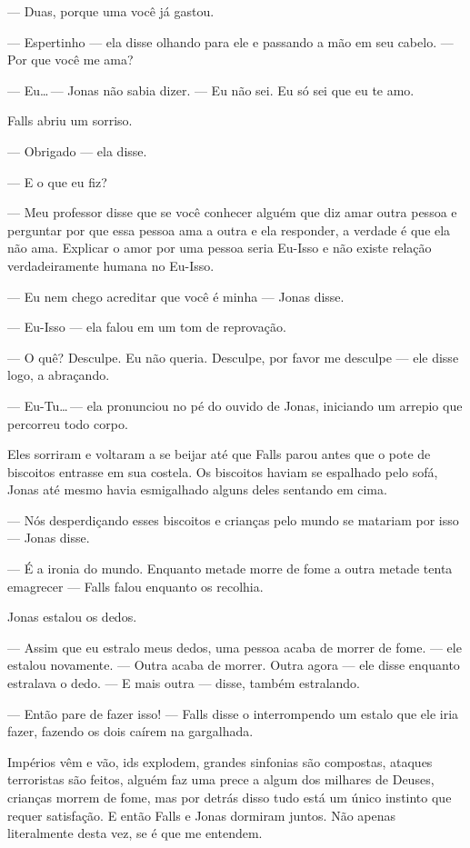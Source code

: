 --- Duas, porque uma você já gastou.

--- Espertinho --- ela disse\mudanca{,} olhando para ele e passando a mão em seu cabelo. --- Por que você me ama?

--- Eu\ldots\,--- Jonas não sabia dizer. --- Eu não sei. Eu só sei que eu te amo.

Falls abriu um sorriso.

--- Obrigado --- ela disse.

--- E o que eu fiz?

--- Meu professor disse que se você conhecer alguém que diz amar outra pessoa e perguntar por que essa pessoa ama a outra e ela responder, a verdade é que ela não ama. Explicar o amor por uma pessoa seria Eu-Isso e não existe relação verdadeiramente humana no Eu-Isso.

--- Eu nem chego acreditar que você é minha --- Jonas disse.

--- Eu-Isso --- ela falou em um tom de reprovação.

--- O quê? Desculpe. Eu não queria. Desculpe, por favor me desculpe --- ele disse logo, a abraçando.

--- Eu-Tu\ldots\,--- ela pronunciou no pé do ouvido de Jonas, iniciando um arrepio que percorreu todo  corpo.

Eles sorriram e voltaram a se beijar até que Falls parou\mudanca{,} antes que o pote de biscoitos entrasse em sua costela. Os biscoitos haviam se espalhado pelo sofá, Jonas até mesmo havia esmigalhado alguns deles sentando em cima.

--- Nós desperdiçando esses biscoitos e crianças pelo mundo se matariam por isso ---  Jonas disse.

--- É a ironia do mundo. Enquanto metade morre de fome\mudanca{,} a outra metade tenta emagrecer --- Falls falou enquanto\mudanca{,} os recolhia.

Jonas estalou os dedos.

--- Assim que eu estralo meus dedos, uma pessoa acaba de morrer de fome. --- ele estalou novamente. --- Outra acaba de morrer. Outra agora --- ele disse enquanto estralava o dedo. --- E mais outra --- disse, também estralando.

--- Então pare de fazer isso! --- Falls disse o interrompendo um estalo que ele iria fazer, fazendo os dois caírem na gargalhada.

Impérios vêm e vão, ids explodem, grandes sinfonias são compostas, ataques terroristas são feitos, alguém faz uma prece a algum dos milhares de Deuses, crianças morrem de fome, mas por detrás disso tudo está um único instinto que requer satisfação. E então Falls e Jonas dormiram juntos. Não apenas literalmente desta vez, se é que me entendem.
